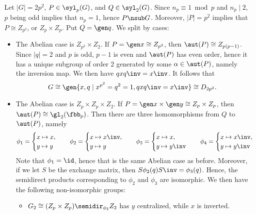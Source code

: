 \begin{sol}
    Let $|G| = 2p^2$, $P \in \syl_p(G)$, and $Q \in \syl_2(G)$.
	Since $n_p \equiv 1 \bmod p$ and $n_p \mid 2$, $p$ being odd implies that $n_p = 1$, hence $P \nsub G$.
	Moreover, $|P| = p^2$ implies that $P \cong Z_{p^2}$, or $Z_p \times Z_p$.
	Put $Q = \gen q$.
	We split by cases:
    \begin{itemize}
        \item The Abelian case is $Z_{p^2} \times Z_2$.
	If $P = \gen x \cong Z_{p^2}$, then $\aut(P) \cong Z_{p(p - 1)}$.
	Since $|q| = 2$ and $p$ is odd, $p - 1$ is even and $\aut(P)$ has even order, hence it has a unique subgroup of order 2 generated by some $\alpha \in \aut(P)$, namely the inversion map.
	We then have $qxq\inv = x\inv$.
	It follows that
        \[
        	G \cong \gen{x, q \mid x^{p^2} = q^2 = 1, qxq\inv = x\inv} \cong D_{2p^2}.
        \]
        \item The Abelian case is $Z_p \times Z_p \times Z_2$.
	If $P = \gen x \times \gen y \cong Z_p \times Z_p$, then $\aut(P) \cong \gl_2(\fbb_p)$.
	Then there are three homomorphisms from $Q$ to $\aut(P)$, namely
        \[
        	\phi_1 = 
            \begin{cases}
                x \mapsto x, \\
                y \mapsto y
            \end{cases} \quad
            \phi_2 = 
            \begin{cases}
                x \mapsto x\inv, \\
                y \mapsto y
            \end{cases} \quad
            \phi_3 = 
            \begin{cases}
                x \mapsto x, \\
                y \mapsto y\inv
            \end{cases} \quad
            \phi_4 = 
            \begin{cases}
                x \mapsto x\inv, \\
                y \mapsto y\inv
            \end{cases}
        \]
        Note that $\phi_1 = \id$, hence that is the same Abelian case as before.
	    Moreover, if we let $S$ be the exchange matrix, then $S\phi_2(q)S\inv = \phi_3(q)$.
	    Hence, the semidirect products corresponding to $\phi_2$ and $\phi_3$ are isomorphic.
	    We then have the following non-isomorphic groups:
        \begin{itemize}
            \item $G_2 \cong (Z_p \times Z_p) \semidir_{\phi_2} Z_2$ has $y$ centralized, while $x$ is inverted.

\end{itemize}
\end{itemize}
\end{sol}
